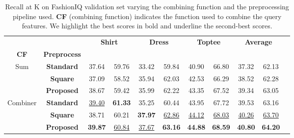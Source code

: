 \documentclass[acmlarge]{acmart}
\begin{document}
\begin{table}[tb]
\centering
\begin{tabular}{ccc  cc cc cc  cc}
\toprule
&&\multicolumn{2}{c}{\textbf{Shirt}} & \multicolumn{2}{c}{\textbf{Dress}} & \multicolumn{2}{c}{\textbf{Toptee}} & \multicolumn{2}{c}{\textbf{Average}}\\
\cmidrule(lr){3-4}
\cmidrule(lr){5-6}
  \cmidrule(lr){7-8}
  \cmidrule(lr){9-10}
\textbf{CF} & \textbf{Preprocess} &  &  &    &  &    &  &    &   \\
\midrule
\multirow{3}{*}{Sum} & \textbf{Standard} & 37.64 & 59.76 & 33.42 & 59.84 & 40.90 & 66.80 & 37.32 & 62.13\\ &\textbf{Square} & 37.09 & 58.52 & 35.94 & 62.03 & 42.53 & 66.29 & 38.52 & 62.28\\ &\textbf{Proposed}  & 38.67 & 59.42 & 35.99 & 62.22 & 43.35 & 67.52 & 39.34 & 63.05 \\ \midrule[.02em]
\multirow{3}{*}{Combiner} & \textbf{Standard} & \underline{39.40} & \textbf{61.33} & 35.25 & 60.44 & 43.95 & 67.72 & 39.53 & 63.16\\ & \textbf{Square} & 38.71 & 60.21 & \textbf{37.97} & \underline{62.86} & \underline{44.12} & \underline{68.03} & \underline{40.26} & \underline{63.70}\\ & \textbf{Proposed} & \textbf{39.87} & \underline{60.84} & \underline{37.67} & \textbf{63.16} & \textbf{44.88} & \textbf{68.59} & \textbf{40.80} & \textbf{64.20} \\ \bottomrule
\end{tabular}


\caption{Recall at K on FashionIQ validation set varying the combining function and the preprocessing pipeline used. \textbf{CF} (combining function) indicates the function used to combine the query features. We highlight the best scores in bold and underline the second-best scores.}
\label{tab:fashioniq-preprocess}
\vspace{-3ex}
\end{table}
\end{document}
